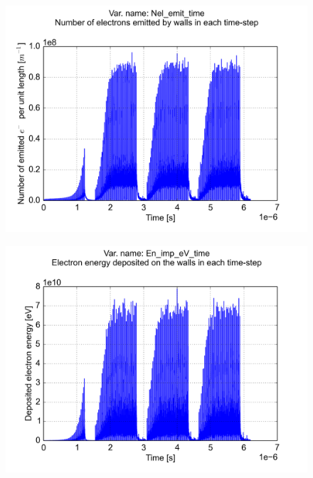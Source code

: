 \documentclass[a4paper,12pt]{article}
\begin{document}
\begin{figure}[p]
\begin{center}
\includegraphics[trim = 0 0 0 0, clip, width=.95\textwidth]{../../example/fig04.png}
\end{center}
\end{figure}

\begin{figure}[p]
\begin{center}
\includegraphics[trim = 0 0 0 0, clip, width=.95\textwidth]{../../example/fig05.png}
\end{center}
\end{figure}
\end{document}
